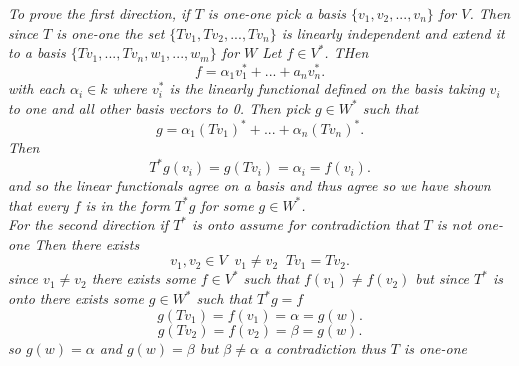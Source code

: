 \documentclass{article}
\begin{document}
{\begin{enumerate}
                \emph{
                    To prove the first direction, if $T$ is one-one pick a basis $ \{v_1,v_2,...,v_n\}$ for $V$.
                    Then since $T$ is one-one the set $\{Tv_1,Tv_2,...,Tv_n\}$ is linearly independent and extend it to a
                    basis $\{Tv_1,...,Tv_n,w_1,...,w_m\}$ for $W$
                    Let  $f \in V^{*}$. THen
                    \[
                    f = \alpha_1 v_1^{*} + ... + a_nv_n^{*}
                    .\] 
                    with each $\alpha_i \in k$
                    where $v_i^{*}$ is the linearly functional defined on the basis taking $v_i $ to one and all other
                    basis vectors to 0.
                    Then pick $g \in W^{*}$ such that
                     \[
                    g = \alpha_1(Tv_1)^{*} + ... + \alpha_n(Tv_n)^{*}
                    .\] 
                    Then
                    \[
                    T^{*}g(v_i) = g(Tv_i) = \alpha_i = f(v_i)
                    .\] 
                    and so the linear functionals agree on a basis and thus agree so we have shown
                    that every $f$ is in the form $T^{*}g$ for some $g \in W^{*}$.\\
                    For the second direction if $T^{*}$ is onto assume for contradiction that $T$ is not one-one
                    Then there exists
                    \[
                    v_1,v_2 \in V \;\; v_1 \ne v_2 \;\; Tv_1=Tv_2
                    .\] 
                    since $v_1 \ne v_2$ there exists some $f \in V^{*}$ such that $f(v_1) \ne f(v_2)$
                    but since $T^{*}$ is onto there exists some $g \in W^{*}$ such that $T^{*}g = f$
                    \[
                    g(Tv_1) = f(v_1) = \alpha = g(w)
                    .\] 
                    \[
                    g(Tv_2) = f(v_2) = \beta = g(w)
                    .\] 
                    so $g(w) = \alpha$ and $g(w) = \beta$ but $\beta \ne \alpha$ a contradiction thus $T$ is one-one
                }
        \end{enumerate}
    }
\end{document}
